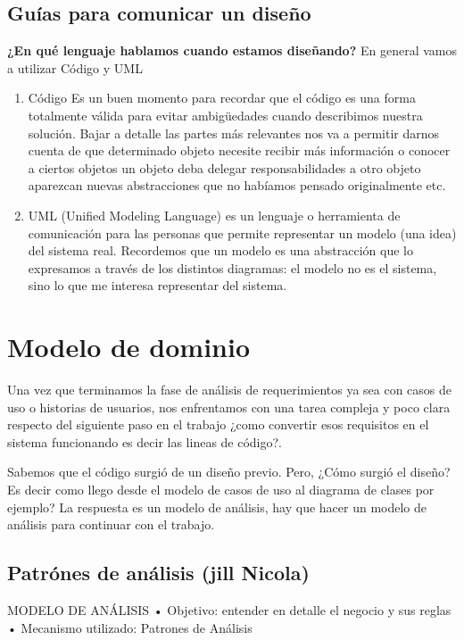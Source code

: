 \documentclass[12pt]{book}
\begin{document}
\section{Guías para comunicar un diseño}

\textbf{¿En qué lenguaje hablamos cuando estamos diseñando?} En general vamos a utilizar Código y UML
\begin{enumerate}
\item Código
Es un buen momento para recordar que el código es una forma totalmente válida para evitar ambigüedades cuando describimos nuestra solución. Bajar a detalle las partes más relevantes nos va a permitir darnos cuenta de que 
determinado objeto necesite recibir más información o conocer a ciertos objetos
un objeto deba delegar responsabilidades a otro objeto
aparezcan nuevas abstracciones que no habíamos pensado originalmente
etc.
\item UML (Unified Modeling Language) 
es un lenguaje o herramienta de comunicación para las personas que permite representar un modelo (una idea) del sistema real. Recordemos que un modelo es una abstracción que lo expresamos a través de los distintos diagramas: el modelo no es el sistema, sino lo que me interesa representar del sistema.
\end{enumerate}

\chapter{Modelo de dominio}
Una vez que terminamos la fase de análisis de requerimientos ya sea con casos de uso o historias de usuarios, nos enfrentamos con una tarea compleja y poco clara respecto del siguiente paso en el trabajo ¿como convertir esos requisitos en el sistema funcionando es decir las lineas de código?.

Sabemos que el código surgió de un diseño previo. Pero, ¿Cómo surgió el diseño? Es decir como llego desde el modelo de casos de uso al diagrama de clases por ejemplo?
La respuesta es un modelo de análisis, hay que hacer un modelo de análisis para continuar con el trabajo.


\section{Patr\'ones de análisis (jill Nicola)}

MODELO DE ANÁLISIS 
• Objetivo: entender en detalle el negocio y sus reglas 
• Mecanismo utilizado: Patrones de Análisis 
\end{document}
